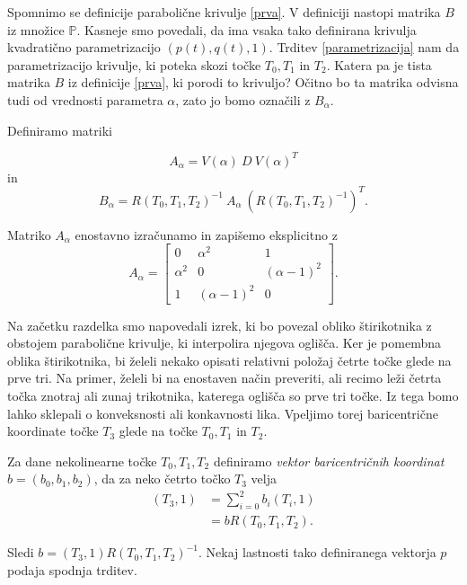 \documentclass[mat1]{fmfdelo}
\newcommand{\PP}{\mathbb P}
\newcommand{\al}{\alpha}
\begin{document}
Spomnimo se definicije parabolične krivulje \ref{prva}. V definiciji nastopi matrika $B$ iz množice $\PP$. Kasneje smo povedali, da ima vsaka tako definirana krivulja kvadratično parametrizacijo $(p(t), q(t), 1)$. Trditev \ref{parametrizacija} nam da parametrizacijo krivulje, ki poteka skozi točke $T_0, T_1$ in $T_2$. Katera pa je tista matrika $B$ iz definicije \ref{prva}, ki porodi to krivuljo? Očitno bo ta matrika odvisna tudi od vrednosti parametra $\al$, zato jo bomo označili z $B_\al$. 
%
\begin{definicija}\label{aalfa}
Definiramo matriki

$$A_{\al} = V(\al) \ D \ V(\al)^T $$
in
$$B_{\al} =  R(T_0, T_1, T_2)^{-1}\  A_{\al} \  (R(T_0, T_1, T_2)^{-1})^T.$$
\end{definicija}

\begin{opomba}
Matriko $A_\al$ enostavno izračunamo in zapišemo eksplicitno z %
$$A_\al = 
\begin{bmatrix}
0 & \al^2 & 1 \\
\al^2 & 0 & (\al - 1)^2 \\
1 & (\al -1)^2 & 0
\end{bmatrix}
.$$

\end{opomba}
%
Na začetku razdelka smo napovedali izrek, ki bo povezal obliko štirikotnika z obstojem parabolične krivulje, ki interpolira njegova oglišča. Ker je pomembna oblika štirikotnika, bi želeli nekako opisati relativni položaj četrte točke glede na prve tri. Na primer, želeli bi na enostaven način preveriti, ali recimo leži četrta točka znotraj ali zunaj trikotnika, katerega oglišča so prve tri točke. Iz tega bomo lahko sklepali o konveksnosti ali konkavnosti lika. Vpeljimo torej baricentrične koordinate točke $T_3$ glede na točke $T_0, T_1$ in $T_2$.

\begin{definicija}
Za dane nekolinearne točke $T_0, T_1, T_2$ definiramo \emph{vektor baricentričnih koordinat} $b = (b_0, b_1, b_2)$, da za neko četrto točko $T_3$ velja
\begin{align*}
(T_3, 1) &= \sum_{i=0}^{2} b_i (T_i, 1) \\
	   & = b R(T_0, T_1, T_2).
	   \end{align*}
\end{definicija}
Sledi $ b = (T_3, 1) R(T_0, T_1, T_2)^{-1}$.
Nekaj lastnosti tako definiranega vektorja $p$ podaja spodnja trditev.
\end{document}
